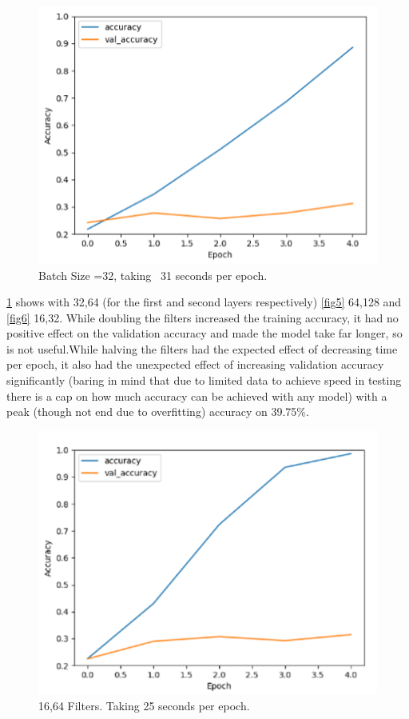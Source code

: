 \begin{figure}[H]
\centering
\includegraphics[scale=1.0]{Media/Testing/fig4.png}
\caption{Batch Size =32, taking ~31 seconds per epoch.}
\label{fig4}
\end{figure}

\cref{fig4} shows with 32,64 (for the first and second layers respectively) \cref{fig5} 64,128 and \cref{fig6} 16,32. While doubling the filters increased the training accuracy, it had no positive effect on the validation accuracy and made the model take far longer, so is not useful.While halving the filters had the expected effect of decreasing time per epoch, it also had the unexpected effect of increasing validation accuracy significantly (baring in mind that due to limited data to achieve speed in testing there is a cap on how much accuracy can be achieved with any model) with a peak (though not end due to overfitting) accuracy on 39.75\%. \\


\begin{figure}[H]
\centering
\includegraphics[scale=1.0]{Media/Testing/fig8.png}
\caption{16,64 Filters. Taking 25 seconds per epoch.}
\label{fig8}
\end{figure}

